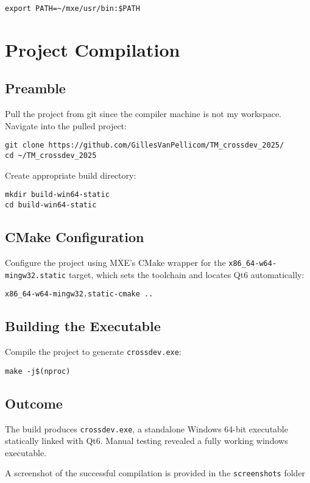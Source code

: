 \documentclass{report}
\begin{document}
\begin{verbatim}
export PATH=~/mxe/usr/bin:$PATH
\end{verbatim}

\chapter{Project Compilation}

\section{Preamble}

Pull the project from git since the compiler machine is not my workspace. Navigate into the pulled project:

\begin{verbatim}
git clone https://github.com/GillesVanPellicom/TM_crossdev_2025/
cd ~/TM_crossdev_2025
\end{verbatim}
Create appropriate build directory:
\begin{verbatim}
mkdir build-win64-static
cd build-win64-static
\end{verbatim}

\section{CMake Configuration}

Configure the project using MXE's CMake wrapper for the \texttt{x86\_64-w64-mingw32.static} target, which sets the toolchain and locates Qt6 automatically:

\begin{verbatim}
x86_64-w64-mingw32.static-cmake ..
\end{verbatim}

\section{Building the Executable}

Compile the project to generate \texttt{crossdev.exe}:

\begin{verbatim}
make -j$(nproc)
\end{verbatim}

\section{Outcome}

The build produces \texttt{crossdev.exe}, a standalone Windows 64-bit executable statically linked with Qt6. Manual testing revealed a fully working windows executable.


A screenshot of the successful compilation is provided in the \texttt{screenshots} folder
\end{document}
